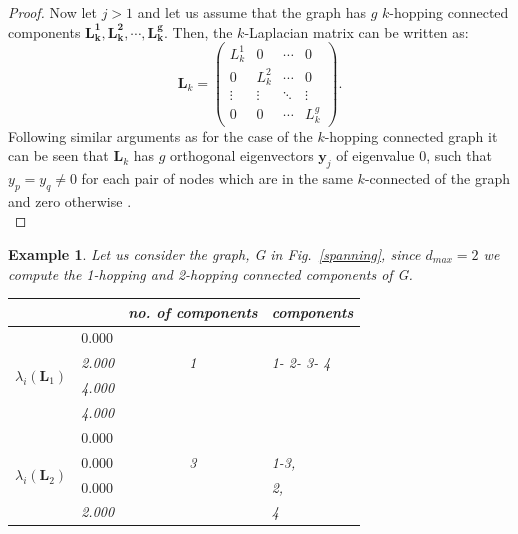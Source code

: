 \documentclass[10pt,a4paper]{article}
\newtheorem{exa}{Example}
\begin{document}
\begin{proof}
    	    	Now let $j>1$ and let us assume that the graph has $g$ $k$-hopping connected components $\mathbf{L_{k}^1,L_{k}^2,\cdots, L_{k}^g }$. Then, the $k$-Laplacian matrix can be written as:
    	    	\begin{equation*}
    	    	\mathbf{L}_k = \begin{pmatrix}
    	    	L_{k}^1 & 0 & \cdots & 0 \\
    	    	0 & L_{k}^2 & \cdots & 0\\
    	    	\vdots& \vdots & \ddots & \vdots \\
    	    	0 & 0 & \cdots & L_{k}^g
    	    	\end{pmatrix}.
    	    	\end{equation*}
    	    	Following similar arguments as for the case of the $k$-hopping connected graph it can be seen that $\mathbf{L}_k$ has $g$ orthogonal eigenvectors $\mathbf{y}_j$ of eigenvalue $0$, such that $y_p = y_q \neq 0$ for each pair of nodes which are in the same $k$-connected of the graph and zero otherwise \citep{estrada2012path}.\\  	
    	    \end{proof}
    	    
    	    \begin{exa}
    	    	Let us consider the graph, G in Fig.~\ref{spanning}, since $d_{max} = 2$ we compute the 1-hopping and 2-hopping connected components of G.
    	    	
    	    	\begin{table}[H]
    	    		\centering
    	    		\begin{tabular}{ |l|l|c|l| }
    	    			\hline
    	    			& & no. of components & components \\
    	    			\hline
    	    			\multirow{4}{*}{$\lambda_i(\mathbf{L}_1)$} & $\mathbf{0.000}$& & \\
    	    			& 2.000& 1& 1- 2- 3- 4\\
    	    			& 4.000 & & \\
    	    			& 4.000 & & \\ \hline
    	    			\multirow{4}{*}{$\lambda_i(\mathbf{L}_2)$} & $\mathbf{0.000}$& & \\
    	    			& $\mathbf{0.000}$& 3 & 1-3,\\
    	    			& $\mathbf{0.000}$ &  & 2,\\
    	    			& 2.000 &  & 4\\
    	    			\hline
    	    		\end{tabular}   
    	    	\end{table}
    	    	
    	    	
    	    \end{exa}
    	    
\end{document}
